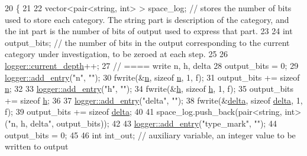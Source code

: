\begin{DoxyCode}
20                                                  \{
21 
22   vector<pair<string, int> > space\_log; \textcolor{comment}{// stores the number of bits used to store each category. The
       string part is description of the category, and the int part is the number of bits of output used to express that
       part.}
23 
24   \textcolor{keywordtype}{int} output\_bits; \textcolor{comment}{// the number of bits in the output corresponding to the current category under
       investigation, to be zeroed at each step.}
25 
26   \hyperlink{classlogger_a9d29b49bd318a719a8e85b59eac54fe0}{logger::current\_depth}++;
27   \textcolor{comment}{// ==== write n, h, delta}
28   output\_bits = 0;
29   \hyperlink{classlogger_a710163deb17bc81f70d53d285b8ac9ac}{logger::add\_entry}(\textcolor{stringliteral}{"n"}, \textcolor{stringliteral}{""});
30   fwrite(&\hyperlink{classmarked__graph__compressed_a8d841016ddb11cfd33748c8deb6277ba}{n}, \textcolor{keyword}{sizeof} \hyperlink{classmarked__graph__compressed_a8d841016ddb11cfd33748c8deb6277ba}{n}, 1, f);
31   output\_bits += \textcolor{keyword}{sizeof} \hyperlink{classmarked__graph__compressed_a8d841016ddb11cfd33748c8deb6277ba}{n};
32 
33   \hyperlink{classlogger_a710163deb17bc81f70d53d285b8ac9ac}{logger::add\_entry}(\textcolor{stringliteral}{"h"}, \textcolor{stringliteral}{""});
34   fwrite(&\hyperlink{classmarked__graph__compressed_af6ff623407b673d08d0cab77b39c2193}{h}, \textcolor{keyword}{sizeof} \hyperlink{classmarked__graph__compressed_af6ff623407b673d08d0cab77b39c2193}{h}, 1, f);
35   output\_bits += \textcolor{keyword}{sizeof} \hyperlink{classmarked__graph__compressed_af6ff623407b673d08d0cab77b39c2193}{h};
36 
37   \hyperlink{classlogger_a710163deb17bc81f70d53d285b8ac9ac}{logger::add\_entry}(\textcolor{stringliteral}{"delta"}, \textcolor{stringliteral}{""});
38   fwrite(&\hyperlink{classmarked__graph__compressed_a8b2aaac68e9332ddc78d88eb60b323a7}{delta}, \textcolor{keyword}{sizeof} \hyperlink{classmarked__graph__compressed_a8b2aaac68e9332ddc78d88eb60b323a7}{delta}, 1, f);
39   output\_bits += \textcolor{keyword}{sizeof} \hyperlink{classmarked__graph__compressed_a8b2aaac68e9332ddc78d88eb60b323a7}{delta};
40 
41   space\_log.push\_back(pair<string, int> (\textcolor{stringliteral}{"n, h, delta"}, output\_bits));
42 
43   \hyperlink{classlogger_a710163deb17bc81f70d53d285b8ac9ac}{logger::add\_entry}(\textcolor{stringliteral}{"type\_mark"}, \textcolor{stringliteral}{""});
44   output\_bits = 0;
45 
46   \textcolor{keywordtype}{int} int\_out; \textcolor{comment}{// auxiliary variable, an integer value to be written to output}

\end{DoxyCode}
